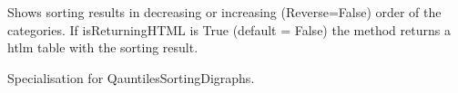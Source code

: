 \documentclass[letterpaper,10pt,english]{sphinxmanual}
\begin{document}
\begin{fulllineitems}
\begin{fulllineitems}
\end{fulllineitems}


\begin{fulllineitems}
\label{techDoc:sortingDigraphs.QuantilesSortingDigraph.showSorting}
Shows sorting results in decreasing or increasing (Reverse=False)
order of the categories. If isReturningHTML is True (default = False)
the method returns a htlm table with the sorting result.

\end{fulllineitems}


\begin{fulllineitems}
\label{techDoc:sortingDigraphs.QuantilesSortingDigraph.showWeakOrder}
Specialisation for QauntilesSortingDigraphs.

\end{fulllineitems}


\end{fulllineitems}

\end{document}
